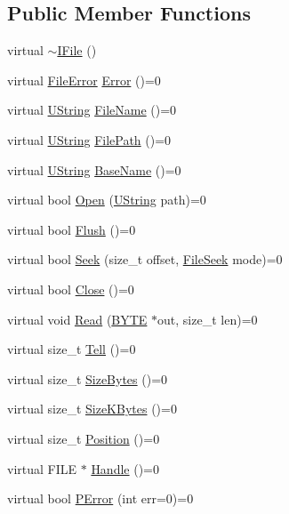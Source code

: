 \subsection*{Public Member Functions}
\begin{DoxyCompactItemize}
\item 
virtual \hyperlink{classVixen_1_1IFile_aedecb0b2d638fdfa33ad9fb8890ccbc6}{$\sim$\+I\+File} ()
\item 
virtual \hyperlink{namespaceVixen_a28cf3e45633036dc0ae46d5ab701af86}{File\+Error} \hyperlink{classVixen_1_1IFile_a5918065a61d316d170d5b20f46a7a770}{Error} ()=0
\item 
virtual \hyperlink{vix__stringutil_8h_a561c282c415a5c38fd9a26325701e3bf}{U\+String} \hyperlink{classVixen_1_1IFile_a23244672c3e59af8dfdfd77fe6df992b}{File\+Name} ()=0
\item 
virtual \hyperlink{vix__stringutil_8h_a561c282c415a5c38fd9a26325701e3bf}{U\+String} \hyperlink{classVixen_1_1IFile_aed9fd463648dbd5a5de9310711e9206b}{File\+Path} ()=0
\item 
virtual \hyperlink{vix__stringutil_8h_a561c282c415a5c38fd9a26325701e3bf}{U\+String} \hyperlink{classVixen_1_1IFile_a5f50dba2f5efaa1b5438b9924dad8d85}{Base\+Name} ()=0
\item 
virtual bool \hyperlink{classVixen_1_1IFile_a719f5df723010adfcaaf2ef6fc02e414}{Open} (\hyperlink{vix__stringutil_8h_a561c282c415a5c38fd9a26325701e3bf}{U\+String} path)=0
\item 
virtual bool \hyperlink{classVixen_1_1IFile_a64d455adfd53b5395ced42605aa77186}{Flush} ()=0
\item 
virtual bool \hyperlink{classVixen_1_1IFile_af1ebf5771acc6e8553797614de65dfd2}{Seek} (size\+\_\+t offset, \hyperlink{namespaceVixen_a3819245066e95e1d70b59a549654e606}{File\+Seek} mode)=0
\item 
virtual bool \hyperlink{classVixen_1_1IFile_ae22fba81f1a450f94bbaa993e342d28b}{Close} ()=0
\item 
virtual void \hyperlink{classVixen_1_1IFile_a4dd88412328626d860870edb22c01d34}{Read} (\hyperlink{vix__platform_8h_a4ae1dab0fb4b072a66584546209e7d58}{B\+Y\+T\+E} $\ast$out, size\+\_\+t len)=0
\item 
virtual size\+\_\+t \hyperlink{classVixen_1_1IFile_a473b1cfa328219a5f85d745fe7f33ebd}{Tell} ()=0
\item 
virtual size\+\_\+t \hyperlink{classVixen_1_1IFile_ade8c8d3e40bebf52130c23a0bace4db8}{Size\+Bytes} ()=0
\item 
virtual size\+\_\+t \hyperlink{classVixen_1_1IFile_aafcb6f019831af8743e5a28fb2753126}{Size\+K\+Bytes} ()=0
\item 
virtual size\+\_\+t \hyperlink{classVixen_1_1IFile_a1ca999110df6a5a71bb07f374df5f722}{Position} ()=0
\item 
virtual F\+I\+L\+E $\ast$ \hyperlink{classVixen_1_1IFile_a94e965cd24ea950f98f269317df6f010}{Handle} ()=0
\item 
virtual bool \hyperlink{classVixen_1_1IFile_aec62be3125fd105bdf059e15b4cd4603}{P\+Error} (int err=0)=0
\end{DoxyCompactItemize}

